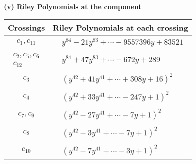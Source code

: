 \documentclass[1p]{elsarticle_modified}
\theoremstyle{definition}
\begin{document}
\newpage\renewcommand{\arraystretch}{1}
\flushleft \textbf{(v) Riley Polynomials at the component}\newline \\
\begin{tabular}{m{50pt}|m{274pt}}
Crossings & \hspace{64pt}Riley Polynomials at each crossing \\
\hline $$\begin{aligned}c_{1},c_{11}\end{aligned}$$&$\begin{aligned}
&y^{84}-21 y^{83}+\cdots-9557396 y+83521
\end{aligned}$\\
\hline $$\begin{aligned}c_{2},c_{5},c_{6}\\c_{12}\end{aligned}$$&$\begin{aligned}
&y^{84}+47 y^{83}+\cdots-672 y+289
\end{aligned}$\\
\hline $$\begin{aligned}c_{3}\end{aligned}$$&$\begin{aligned}
&(y^{42}+41 y^{41}+\cdots+308 y+16)^{2}
\end{aligned}$\\
\hline $$\begin{aligned}c_{4}\end{aligned}$$&$\begin{aligned}
&(y^{42}+33 y^{41}+\cdots-247 y+1)^{2}
\end{aligned}$\\
\hline $$\begin{aligned}c_{7},c_{9}\end{aligned}$$&$\begin{aligned}
&(y^{42}-27 y^{41}+\cdots-7 y+1)^{2}
\end{aligned}$\\
\hline $$\begin{aligned}c_{8}\end{aligned}$$&$\begin{aligned}
&(y^{42}-3 y^{41}+\cdots-7 y+1)^{2}
\end{aligned}$\\
\hline $$\begin{aligned}c_{10}\end{aligned}$$&$\begin{aligned}
&(y^{42}-7 y^{41}+\cdots-3 y+1)^{2}
\end{aligned}$\\
\hline
\end{tabular}\\~\\
\end{document}
